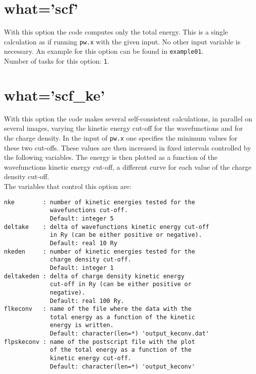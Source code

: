 \documentclass[12pt,a4paper,twoside]{report}
\begin{document}
\newpage
{\color{coral}\section{what='scf'}}
\color{black}
With this option the code computes only the total energy. This is a single
calculation as if running \texttt{pw.x} with the given input.
No other input variable is necessary.
An example for this option can be found in \texttt{example01}. \\
Number of tasks for this option: \texttt{1}.

\newpage
{\color{coral}\section{what='scf\_ke'}}
\color{black}
With this option the code makes several self-consistent calculations, 
in parallel on several images, varying the kinetic energy cut-off for 
the wavefunctions and for the charge density. 
In the input of \texttt{pw.x} one specifies the minimum values for these two 
cut-offs. These values are then increased in fixed intervals controlled by the 
following variables. The energy is then plotted as a function of the 
wavefunctions kinetic energy cut-off, a different curve for each value of 
the charge density cut-off. \\
The variables that control this option are:

\begin{verbatim}
nke        : number of kinetic energies tested for the 
             wavefunctions cut-off.
             Default: integer 5
deltake    : delta of wavefunctions kinetic energy cut-off 
             in Ry (can be either positive or negative).
             Default: real 10 Ry
nkeden     : number of kinetic energies tested for the 
             charge density cut-off.
             Default: integer 1
deltakeden : delta of charge density kinetic energy 
             cut-off in Ry (can be either positive or 
             negative).
             Default: real 100 Ry.
flkeconv   : name of the file where the data with the 
             total energy as a function of the kinetic 
             energy is written.
             Default: character(len=*) 'output_keconv.dat'
flpskeconv : name of the postscript file with the plot 
             of the total energy as a function of the 
             kinetic energy cut-off.
             Default: character(len=*) 'output_keconv'
\end{verbatim}
\end{document}
